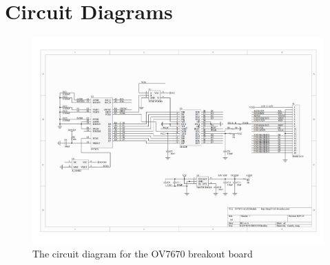 \chapter{Circuit Diagrams} \label{Chapter:AppendixA:CircuitDiagrams}
\begin{figure}
\centering
\includegraphics[width=\textheight-4cm,keepaspectratio]{Figures/OV7670_Schematic.jpg} 
\caption{The circuit diagram for the OV7670 breakout board}
\label{OV7670_Schematic}

\end{figure}
\clearpage
